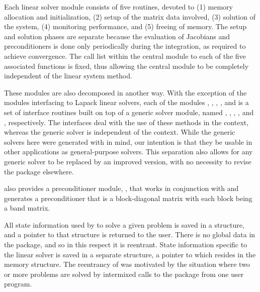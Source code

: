 Each {\ida} linear solver module consists of five routines, devoted to
(1) memory allocation and initialization, (2) setup of the matrix data
involved, (3) solution of the system, (4) monitoring performance,
and (5) freeing of memory.  
The setup and solution phases are separate because the evaluation of
Jacobians and preconditioners is done only periodically during the
integration, as required to achieve convergence. The call list within
the central {\ida} module to each of the five associated functions is
fixed, thus allowing the central module to be completely independent
of the linear system method.

These modules are also decomposed in another way.
With the exception of the modules interfacing to Lapack linear solvers,
each of the modules {\idadense}, {\idaband}, {\idaspgmr}, {\idaspbcg}, and {\idasptfqmr}
is a set of interface routines built on top of a generic solver module, 
named {\dense}, {\band}, {\spgmr}, {\spbcg}, and {\sptfqmr}, respectively.  
The interfaces deal with the use of these methods in the {\ida} context, 
whereas the generic solver is independent of the context.
While the generic solvers here were generated with {\sundials} in mind, our
intention is that they be usable in other applications as
general-purpose solvers.  This separation also allows for any generic
solver to be replaced by an improved version, with no necessity to
revise the {\ida} package elsewhere.

{\ida} also provides a preconditioner module,
{\idabbdpre}, that works in conjunction with {\nvecp} and generates a 
preconditioner that is a block-diagonal matrix with each block being 
a band matrix.

All state information used by {\ida} to solve a given problem is saved
in a structure, and a pointer to that structure is returned to the
user.  There is no global data in the {\ida} package, and so in this
respect it is reentrant. State information specific to the linear
solver is saved in a separate structure, a pointer to which resides in
the {\ida} memory structure. The reentrancy of {\ida} was motivated
by the situation where two or more problems are solved by
intermixed calls to the package from one user program.

